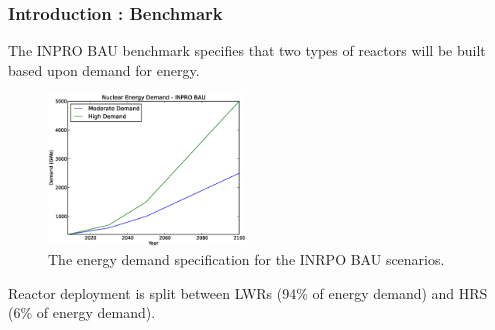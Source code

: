 \begin{frame}[ctb!]
  \frametitle{Introduction : Benchmark}
  The INPRO BAU benchmark specifies that two types of reactors will
  be built based upon demand for energy.
  \begin{figure}[htbp!]
    \begin{center}
      \includegraphics[height=4cm]{inpro-demand.eps}
    \caption{The energy demand specification for the INRPO BAU scenarios.}
    \label{fig:inpro-demand}
    \end{center}  
  \end{figure}
  Reactor deployment is split between LWRs (94\% of energy demand) and
  HRS (6\% of energy demand).
\end{frame}
